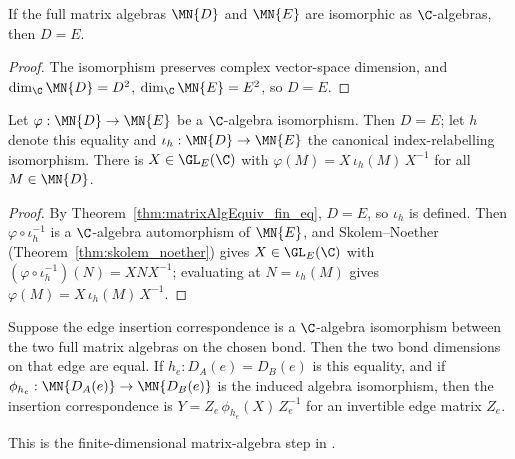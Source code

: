 \begin{theorem}%
    \label{thm:matrixAlgEquiv_fin_eq}
    \leanok
    If the full matrix algebras $\MN{D}$ and $\MN{E}$ are isomorphic as
    $\C$-algebras, then $D = E$.
\end{theorem}

\begin{proof}\leanok
    The isomorphism preserves complex vector-space dimension, and $\dim_{\C}
        \MN{D} = D^2$, $\dim_{\C} \MN{E} = E^2$, so $D = E$.
\end{proof}

\begin{theorem}%
    \label{thm:matrixAlgEquiv_inner_of_fin}
    \leanok
    Let $\varphi : \MN{D} \to \MN{E}$ be a $\C$-algebra isomorphism. Then
    $D = E$; let $h$ denote this equality and $\iota_h : \MN{D} \to \MN{E}$ the
    canonical index-relabelling isomorphism. There is $X \in \GL_{E}(\C)$ with
    $\varphi(M) = X\,\iota_h(M)\,X^{-1}$ for all $M \in \MN{D}$.
\end{theorem}

\begin{proof}\leanok
    By Theorem~\ref{thm:matrixAlgEquiv_fin_eq}, $D = E$, so $\iota_h$ is defined.
    Then $\varphi \circ \iota_h^{-1}$ is a $\C$-algebra automorphism of $\MN{E}$,
    and Skolem--Noether (Theorem~\ref{thm:skolem_noether}) gives $X \in
        \GL_{E}(\C)$ with $(\varphi \circ \iota_h^{-1})(N) = X N X^{-1}$; evaluating
    at $N = \iota_h(M)$ gives $\varphi(M) = X\,\iota_h(M)\,X^{-1}$.
\end{proof}

\begin{theorem}%
    \label{thm:peps_edgeGaugeFromInsertionAlgebraIsomorphism}
    \leanok
    Suppose the edge insertion correspondence is a $\C$-algebra isomorphism
    between the two full matrix algebras on the chosen bond. Then the two bond
    dimensions on that edge are equal. If $h_e:D_A(e)=D_B(e)$ is this
    equality, and if
    $\phi_{h_e}:\MN{D_A(e)}\to\MN{D_B(e)}$ is the induced algebra
    isomorphism, then the insertion correspondence is
    $Y=Z_e\,\phi_{h_e}(X)\,Z_e^{-1}$ for an invertible edge matrix $Z_e$.
    \begin{center}
    \end{center}
    This is the finite-dimensional matrix-algebra step in
    \cite[Section~3]{Molnar2018NormalPEPS}.
\end{theorem}

